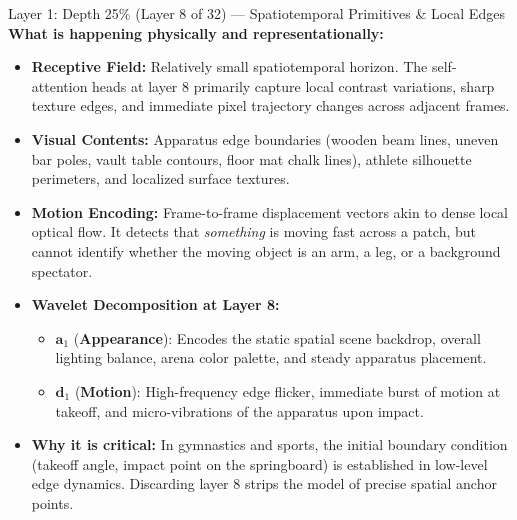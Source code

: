 \documentclass[a4paper, 11pt]{article}
\begin{document}
\begin{layerbox}{Layer 1: Depth 25\% (Layer 8 of 32) --- Spatiotemporal Primitives \& Local Edges}
\textbf{What is happening physically and representationally:}
\begin{itemize}
    \item \textbf{Receptive Field:} Relatively small spatiotemporal horizon. The self-attention heads at layer 8 primarily capture local contrast variations, sharp texture edges, and immediate pixel trajectory changes across adjacent frames.
    \item \textbf{Visual Contents:} Apparatus edge boundaries (wooden beam lines, uneven bar poles, vault table contours, floor mat chalk lines), athlete silhouette perimeters, and localized surface textures.
    \item \textbf{Motion Encoding:} Frame-to-frame displacement vectors akin to dense local optical flow. It detects that \emph{something} is moving fast across a patch, but cannot identify whether the moving object is an arm, a leg, or a background spectator.
    \item \textbf{Wavelet Decomposition at Layer 8:}
    \begin{itemize}
        \item $\mathbf{a}_1$ (\textbf{Appearance}): Encodes the static spatial scene backdrop, overall lighting balance, arena color palette, and steady apparatus placement.
        \item $\mathbf{d}_1$ (\textbf{Motion}): High-frequency edge flicker, immediate burst of motion at takeoff, and micro-vibrations of the apparatus upon impact.
    \end{itemize}
    \item \textbf{Why it is critical:} In gymnastics and sports, the initial boundary condition (takeoff angle, impact point on the springboard) is established in low-level edge dynamics. Discarding layer 8 strips the model of precise spatial anchor points.
\end{itemize}
\end{layerbox}

\vspace{0.3cm}
\end{document}
